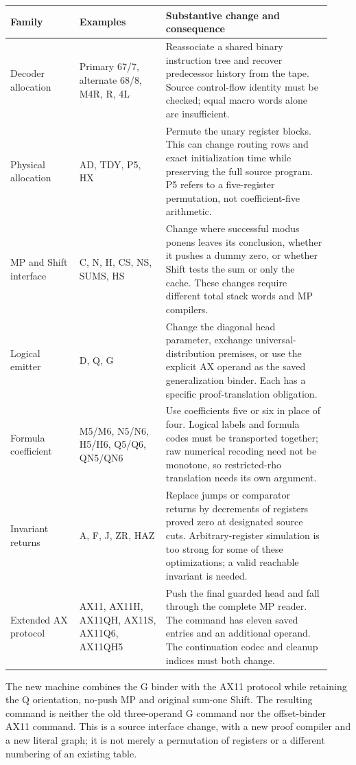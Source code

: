 \documentclass[11pt,letterpaper]{article}
\begin{document}
\begin{longtable}{@{}p{0.20\linewidth}p{0.25\linewidth}p{0.48\linewidth}@{}}
\toprule Family & Examples & Substantive change and consequence\\\midrule\endhead
Decoder allocation & Primary 67/7, alternate 68/8, M4R, R, 4L &
Reassociate a shared binary instruction tree and recover predecessor
history from the tape. Source control-flow identity must be checked;
equal macro words alone are insufficient.\\[4pt]
Physical allocation & AD, TDY, P5, HX &
Permute the unary register blocks. This can change routing rows and exact
initialization time while preserving the full source program. P5 refers
to a five-register permutation, not coefficient-five arithmetic.\\[4pt]
MP and Shift interface & C, N, H, CS, NS, SUMS, HS &
Change where successful modus ponens leaves its conclusion, whether it
pushes a dummy zero, or whether Shift tests the sum or only the cache.
These changes require different total stack words and MP compilers.\\[4pt]
Logical emitter & D, Q, G &
Change the diagonal head parameter, exchange universal-distribution
premises, or use the explicit AX operand as the saved generalization
binder. Each has a specific proof-translation obligation.\\[4pt]
Formula coefficient & M5/M6, N5/N6, H5/H6, Q5/Q6, QN5/QN6 &
Use coefficients five or six in place of four. Logical labels and formula
codes must be transported together; raw numerical recoding need not be
monotone, so restricted-rho translation needs its own argument.\\[4pt]
Invariant returns & A, F, J, ZR, HAZ &
Replace jumps or comparator returns by decrements of registers proved
zero at designated source cuts. Arbitrary-register simulation is too
strong for some of these optimizations; a valid reachable invariant is needed.\\[4pt]
Extended AX protocol & AX11, AX11H, AX11QH, AX11S, AX11Q6, AX11QH5 &
Push the final guarded head and fall through the complete MP reader.
The command has eleven saved entries and an additional operand. The
continuation codec and cleanup indices must both change.\\
\bottomrule
\end{longtable}

The new machine combines the G binder with the AX11 protocol while
retaining the Q orientation, no-push MP and original sum-one Shift.
The resulting command is neither the old three-operand G command nor
the offset-binder AX11 command. This is a source interface change, with a
new proof compiler and a new literal graph; it is not merely a permutation
of registers or a different numbering of an existing table.
\end{document}
